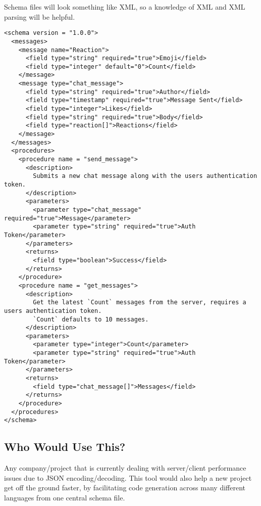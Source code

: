 \documentclass[11pt]{article}
\begin{document}
Schema files will look something like XML, so a knowledge of XML and XML parsing will be helpful.
\begin{verbatim}
<schema version = "1.0.0">
  <messages>
    <message name="Reaction">
      <field type="string" required="true">Emoji</field>
      <field type="integer" default="0">Count</field>
    </message>
    <message type="chat_message">
      <field type="string" required="true">Author</field>
      <field type="timestamp" required="true">Message Sent</field>
      <field type="integer">Likes</field>
      <field type="string" required="true">Body</field>
      <field type="reaction[]">Reactions</field>
    </message>
  </messages>
  <procedures>
    <procedure name = "send_message">
      <description>
        Submits a new chat message along with the users authentication token.
      </description>
      <parameters>
        <parameter type="chat_message" required="true">Message</parameter>
        <parameter type="string" required="true">Auth Token</parameter>
      </parameters>
      <returns>
        <field type="boolean">Success</field>
      </returns>
    </procedure>
    <procedure name = "get_messages">
      <description>
        Get the latest `Count` messages from the server, requires a users authentication token.
        `Count` defaults to 10 messages.
      </description>
      <parameters>
        <parameter type="integer">Count</parameter>
        <parameter type="string" required="true">Auth Token</parameter>
      </parameters>
      <returns>
        <field type="chat_message[]">Messages</field>
      </returns>
    </procedure>
  </procedures>
</schema>
\end{verbatim}
\subsection{Who Would Use This?}
\label{sec:org38654c4}
Any company/project that is currently dealing with server/client performance issues due to JSON encoding/decoding. This tool would also help a new project get off the ground faster, by facilitating code generation across many different languages from one central schema file.
\end{document}
